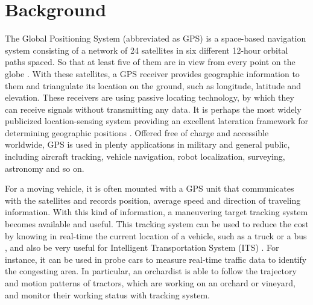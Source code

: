 
%
%
%



\section{Background}


The Global Positioning System (abbreviated as GPS) is a space-based navigation system consisting of a network of 24 satellites in six different 12-hour orbital paths spaced. So that at least five of them are in view from every point on the globe \cite{kaplan2005understanding} \cite{bajaj2002gps}. With these satellites, a GPS receiver provides geographic information to them and triangulate its location on the ground, such as longitude, latitude and elevation. These receivers are using passive locating technology, by which they can receive signals without transmitting any data. It is perhaps the most widely publicized location-sensing system providing an excellent lateration framework for determining geographic positions \cite{hightower2001location}. Offered free of charge and accessible worldwide, GPS is used in plenty applications in military and general public, including aircraft tracking, vehicle navigation, robot localization, surveying, astronomy and so on. 

For a moving vehicle, it is often mounted with a GPS unit that communicates with the satellites and records position, average speed and direction of traveling information. With this kind of information, a maneuvering target tracking system becomes available and useful. This tracking system can be used to reduce the cost by knowing in real-time the current location of a vehicle, such as a truck or a bus \cite{chadil2008real}, and also be very useful for Intelligent Transportation System (ITS) \cite{mcdonald2006intelligent}. For instance, it can be used in probe cars to measure real-time traffic data to identify the congesting area. In particular, an orchardist is able to follow the trajectory and motion patterns of tractors, which are working on an orchard or vineyard, and monitor their working status with tracking system. 


